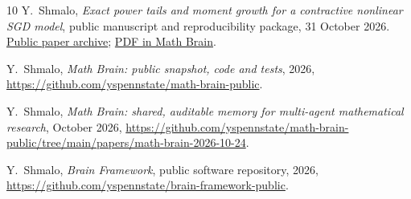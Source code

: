 \documentclass[11pt,a4paper]{article}
\numberwithin{equation}{section}
\theoremstyle{remark}
\begin{document}
\begin{thebibliography}{10}
Y.~Shmalo, \emph{Exact power tails and moment growth for a contractive nonlinear SGD model}, public manuscript and reproducibility package, 31 October 2026.
\href{https://github.com/yspennstate/math-brain-public/tree/main/papers/three-targets-2026-10-31/T228}{Public paper archive};
\href{https://github.com/yspennstate/math-brain-public/blob/main/papers/three-targets-2026-10-31/T228/T228_Nonlinear_SGD_Power_Tails.pdf}{PDF in Math Brain}.

 Y.~Shmalo, \emph{Math Brain: public snapshot, code and tests}, 2026, \url{https://github.com/yspennstate/math-brain-public}.

 Y.~Shmalo, \emph{Math Brain: shared, auditable memory for multi-agent mathematical research}, October 2026, \url{https://github.com/yspennstate/math-brain-public/tree/main/papers/math-brain-2026-10-24}.

 Y.~Shmalo, \emph{Brain Framework}, public software repository, 2026, \url{https://github.com/yspennstate/brain-framework-public}.

\end{thebibliography}
\end{document}
